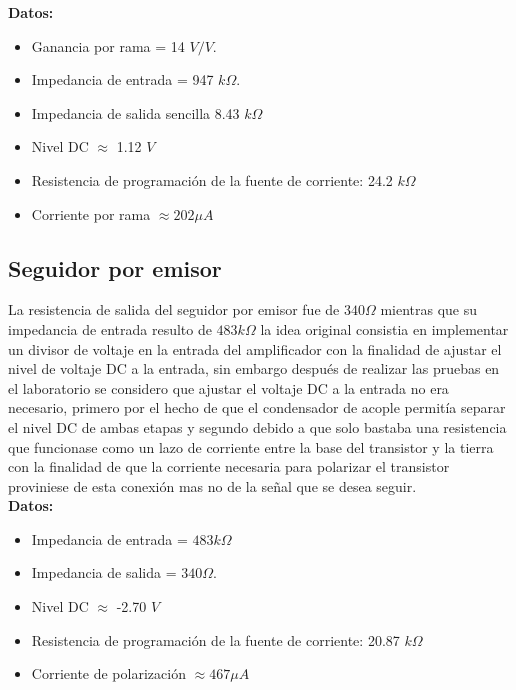 
\textbf{Datos:}
\begin{itemize}
  \item Ganancia por rama = 14 $V/V$.
  \item Impedancia de entrada = 947 $k\Omega$.
  \item Impedancia de salida sencilla 8.43 $k\Omega$
  \item Nivel DC $\approx$ 1.12 $V$
  \item Resistencia de programación de la fuente de corriente: 24.2 $k\Omega$
  \item Corriente por rama $\approx 202 \mu A$
\end{itemize}
\subsection{Seguidor por emisor}
La resistencia de salida del seguidor por emisor fue de $340 \Omega$ mientras que su impedancia de entrada resulto de $483 k\Omega$ la idea original consistia en implementar un divisor de voltaje en la entrada del amplificador con la finalidad de ajustar el nivel de voltaje DC a la entrada, sin embargo después de realizar las pruebas en el laboratorio se considero que ajustar el voltaje DC a la entrada no era necesario, primero por el hecho de que el condensador de acople permitía separar el nivel DC de ambas etapas y segundo debido a que solo bastaba una resistencia que funcionase como un lazo de corriente entre la base del transistor y la tierra con la finalidad de que la corriente necesaria para polarizar el transistor proviniese de esta conexión mas no de la señal que se desea seguir. \\

\textbf{Datos:}
\begin{itemize}
\item Impedancia de entrada = $483 k\Omega$
\item Impedancia de salida  = $340 \Omega$.
\item Nivel DC $\approx$ -2.70 $V$
\item Resistencia de programación de la fuente de corriente: 20.87 $k\Omega$
\item Corriente de polarización $\approx 467 \mu A$
\end{itemize}

